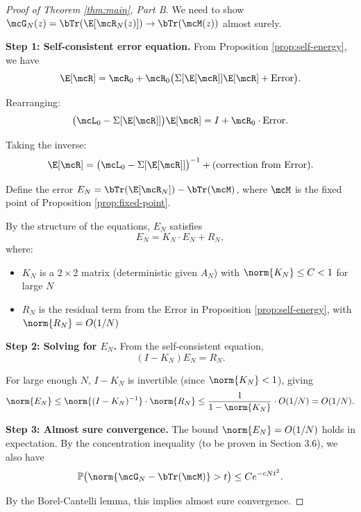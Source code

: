 \begin{proof}[Proof of Theorem \ref{thm:main}, Part B]
We need to show $\mcG_N(z) = \bTr(\E[\mcR_N(z)]) \to \bTr(\mcM(z))$ almost surely.

\textbf{Step 1: Self-consistent error equation.} From Proposition \ref{prop:self-energy}, we have
\[
\E[\mcR] = \mcR_0 + \mcR_0 \bigl(\Sigma[\E[\mcR]] \E[\mcR] + \text{Error}\bigr).
\]

Rearranging:
\[
\bigl(\mcL_0 - \Sigma[\E[\mcR]]\bigr) \E[\mcR] = I + \mcR_0 \cdot \text{Error}.
\]

Taking the inverse:
\[
\E[\mcR] = \bigl(\mcL_0 - \Sigma[\E[\mcR]]\bigr)^{-1} + (\text{correction from Error}).
\]

Define the error $E_N = \bTr(\E[\mcR_N]) - \bTr(\mcM)$, where $\mcM$ is the fixed point of Proposition \ref{prop:fixed-point}.

By the structure of the equations, $E_N$ satisfies
\[
E_N = K_N \cdot E_N + R_N,
\]
where:
\begin{itemize}
\item $K_N$ is a $2 \times 2$ matrix (deterministic given $A_N$) with $\norm{K_N} \leq C < 1$ for large $N$
\item $R_N$ is the residual term from the Error in Proposition \ref{prop:self-energy}, with $\norm{R_N} = O(1/N)$
\end{itemize}

\textbf{Step 2: Solving for $E_N$.} From the self-consistent equation,
\[
(I - K_N) E_N = R_N.
\]

For large enough $N$, $I - K_N$ is invertible (since $\norm{K_N} < 1$), giving
\[
\norm{E_N} \leq \norm{(I - K_N)^{-1}} \cdot \norm{R_N} \leq \frac{1}{1 - \norm{K_N}} \cdot O(1/N) = O(1/N).
\]

\textbf{Step 3: Almost sure convergence.} The bound $\norm{E_N} = O(1/N)$ holds in expectation. By the concentration inequality (to be proven in Section 3.6), we also have
\[
\mathbb{P}\bigl(\norm{\mcG_N - \bTr(\mcM)} > t\bigr) \leq Ce^{-cNt^2}.
\]

By the Borel-Cantelli lemma, this implies almost sure convergence.
\end{proof}

